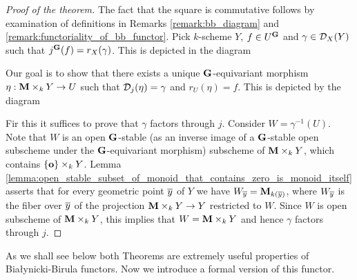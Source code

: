 \begin{proof}[Proof of the theorem]
The fact that the square is commutative follows by examination of definitions in Remarks \ref{remark:bb_diagram} and \ref{remark:functoriality_of_bb_functor}. Pick $k$-scheme $Y$, $f\in U^{\mathbf{G}}$ and $\gamma \in {\mathcal D}_X(Y)$ such that $j^{\mathbf{G}}(f) = r_X(\gamma)$. This is depicted in the diagram
\begin{center}
\end{center}
Our goal is to show that there exists a unique $\mathbf{G}$-equivariant morphism $\eta:\mathbf{M}\times_kY\rightarrow U$ such that ${\mathcal D}_j(\eta) = \gamma$ and $r_U(\eta) = f$. This is depicted by the diagram
\begin{center}
\end{center}
Fir this it suffices to prove that $\gamma$ factors through $j$. Consider $W = \gamma^{-1}(U)$. Note that $W$ is an open $\mathbf{G}$-stable (as an inverse image of a $\mathbf{G}$-stable open subscheme under the $\mathbf{G}$-equivariant morphism) subscheme of $\mathbf{M}\times_kY$, which contains $\{\mathbf{o}\} \times_k Y$. Lemma \ref{lemma:open_stable_subset_of_monoid_that_contains_zero_is_monoid_itself} asserts that for every geometric point $\overline{y}$ of $Y$ we have $W_{\overline{y}} = \mathbf{M}_{k(\overline{y})}$, where $W_{\overline{y}}$ is the fiber over $\overline{y}$ of the projection $\mathbf{M}\times_kY\rightarrow Y$ restricted to $W$. Since $W$ is open subscheme of $\mathbf{M}\times_kY$, this implies that $W = \mathbf{M}\times_kY$ and hence $\gamma$ factors through $j$.
\end{proof}
\noindent
As we shall see below both Theorems are extremely useful properties of Bia{\l}ynicki-Birula functors. Now we introduce a formal version of this functor.

